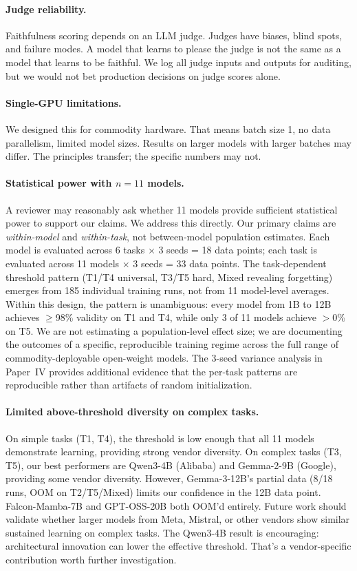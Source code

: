 \documentclass[11pt]{article}
\begin{document}
\paragraph{Judge reliability.}
Faithfulness scoring depends on an LLM judge.
Judges have biases, blind spots, and failure modes.
A model that learns to please the judge is not the same as a model that learns to be faithful.
We log all judge inputs and outputs for auditing, but we would not bet production decisions on judge scores alone.

\paragraph{Single-GPU limitations.}
We designed this for commodity hardware.
That means batch size 1, no data parallelism, limited model sizes.
Results on larger models with larger batches may differ.
The principles transfer; the specific numbers may not.

\paragraph{Statistical power with $n=11$ models.}
A reviewer may reasonably ask whether 11 models provide sufficient statistical power to support our claims.  We address this directly.  Our primary claims are \emph{within-model} and \emph{within-task}, not between-model population estimates.  Each model is evaluated across 6 tasks $\times$ 3 seeds = 18 data points; each task is evaluated across 11 models $\times$ 3 seeds = 33 data points.  The task-dependent threshold pattern (T1/T4 universal, T3/T5 hard, Mixed revealing forgetting) emerges from 185 individual training runs, not from 11 model-level averages.  Within this design, the pattern is unambiguous: every model from 1B to 12B achieves $\geq$98\% validity on T1 and T4, while only 3 of 11 models achieve $>$0\% on T5. We are not estimating a population-level effect size; we are documenting the outcomes of a specific, reproducible training regime across the full range of commodity-deployable open-weight models.  The 3-seed variance analysis in Paper~IV provides additional evidence that the per-task patterns are reproducible rather than artifacts of random initialization.

\paragraph{Limited above-threshold diversity on complex tasks.}
On simple tasks (T1, T4), the threshold is low enough that all 11 models demonstrate learning, providing strong vendor diversity.
On complex tasks (T3, T5), our best performers are Qwen3-4B (Alibaba) and Gemma-2-9B (Google), providing some vendor diversity.
However, Gemma-3-12B's partial data (8/18 runs, OOM on T2/T5/Mixed) limits our confidence in the 12B data point.
Falcon-Mamba-7B and GPT-OSS-20B both OOM'd entirely.
Future work should validate whether larger models from Meta, Mistral, or other vendors show similar sustained learning on complex tasks.
The Qwen3-4B result is encouraging: architectural innovation can lower the effective threshold.  That's a vendor-specific contribution worth further investigation.
\end{document}
